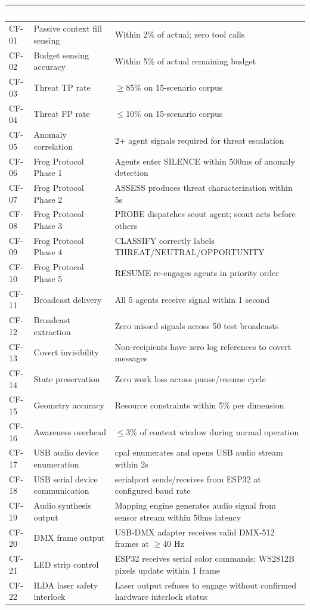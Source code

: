 \documentclass[11pt,letterpaper]{article}
\newcommand{\tableheader}[1]{\textbf{\sffamily\textcolor{white}{#1}}}
\begin{document}
\begin{center}
\begin{tabularx}{\textwidth}{C{1.2cm}L{3.5cm}X}
\toprule
{}
\tableheader{ID} & \tableheader{Verifies} & \tableheader{Expected Behavior} \\
\midrule
CF-01 & Passive context fill sensing & Within 2\% of actual; zero tool calls \\
CF-02 & Budget sensing accuracy & Within 5\% of actual remaining budget \\
CF-03 & Threat TP rate & $\geq$85\% on 15-scenario corpus \\
CF-04 & Threat FP rate & $\leq$10\% on 15-scenario corpus \\
CF-05 & Anomaly correlation & 2+ agent signals required for threat escalation \\
CF-06 & Frog Protocol Phase 1 & Agents enter SILENCE within 500ms of anomaly detection \\
CF-07 & Frog Protocol Phase 2 & ASSESS produces threat characterization within 5s \\
CF-08 & Frog Protocol Phase 3 & PROBE dispatches scout agent; scout acts before others \\
CF-09 & Frog Protocol Phase 4 & CLASSIFY correctly labels THREAT/NEUTRAL/OPPORTUNITY \\
CF-10 & Frog Protocol Phase 5 & RESUME re-engages agents in priority order \\
CF-11 & Broadcast delivery & All 5 agents receive signal within 1 second \\
CF-12 & Broadcast extraction & Zero missed signals across 50 test broadcasts \\
CF-13 & Covert invisibility & Non-recipients have zero log references to covert messages \\
CF-14 & State preservation & Zero work loss across pause/resume cycle \\
CF-15 & Geometry accuracy & Resource constraints within 5\% per dimension \\
CF-16 & Awareness overhead & $\leq$3\% of context window during normal operation \\
CF-17 & USB audio device enumeration & cpal enumerates and opens USB audio stream within 2s \\
CF-18 & USB serial device communication & serialport sends/receives from ESP32 at configured baud rate \\
CF-19 & Audio synthesis output & Mapping engine generates audio signal from sensor stream within 50ms latency \\
CF-20 & DMX frame output & USB-DMX adapter receives valid DMX-512 frames at $\geq$40 Hz \\
CF-21 & LED strip control & ESP32 receives serial color commands; WS2812B pixels update within 1 frame \\
CF-22 & ILDA laser safety interlock & Laser output refuses to engage without confirmed hardware interlock status \\
\bottomrule
\end{tabularx}
\end{center}
\end{document}
